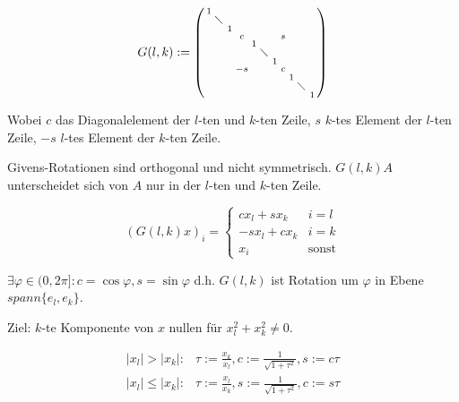 $$G(l,k) := \left(\begin{smallmatrix}
1 &           &   &    &   &           &   &   &   &           &   \\
  & \diagdown &   &    &   &           &   &   &   &           &   \\
  &           & 1 &    &   &           &   &   &   &           &   \\
  &           &   &  c &   &           &   & s &   &           &   \\
  &           &   &    & 1 &           &   &   &   &           &   \\
  &           &   &    &   & \diagdown &   &   &   &           &   \\
  &           &   &    &   &           & 1 &   &   &           &   \\
  &           &   & -s &   &           &   & c &   &           &   \\
  &           &   &    &   &           &   &   & 1 &           &   \\
  &           &   &    &   &           &   &   &   & \diagdown &   \\
  &           &   &    &   &           &   &   &   &           & 1
\end{smallmatrix}\right)$$

Wobei $c$ das Diagonalelement der $l$-ten und $k$-ten Zeile, $s$ $k$-tes Element der $l$-ten Zeile, $-s$ $l$-tes Element der $k$-ten Zeile.

Givens-Rotationen sind orthogonal und nicht symmetrisch. $G(l,k)A$ unterscheidet sich von $A$ nur in der $l$-ten und $k$-ten Zeile.

\vspace{-4mm}
$$(G(l,k)x)_i = \begin{cases}
	cx_l  + sx_k & i=l \\
	-sx_l + cx_k & i=k \\
	x_i          & \text{sonst}
\end{cases}$$

$\exists \varphi \in (0,2\pi] : c=\cos{\varphi}, s=\sin{\varphi}$ d.h. $G(l,k)$ ist Rotation um $\varphi$ in Ebene $spann\{e_l,e_k\}$.

Ziel: $k$-te Komponente von $x$ nullen für $x_l^2+x_k^2 \neq 0$.

\begin{align*}
	|x_l| > |x_k| :    &\tau := \frac{x_k}{x_l}, c := \frac{1}{\sqrt{1+\tau^2}}, s := c\tau \\
	|x_l| \leq |x_k| : &\tau := \frac{x_l}{x_k}, s := \frac{1}{\sqrt{1+\tau^2}}, c := s\tau
\end{align*}

